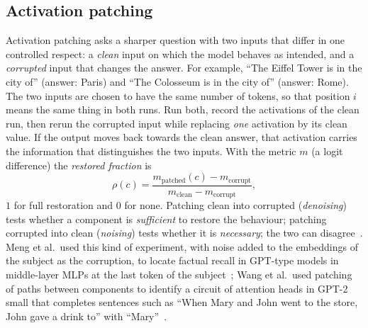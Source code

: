 \documentclass[11pt]{article}
\begin{document}
\subsection{Activation patching}\label{sec:patching}

Activation patching asks a sharper question with two inputs that differ in one controlled respect: a \emph{clean} input on
which the model behaves as intended, and a \emph{corrupted} input that changes the answer. For example, ``The Eiffel Tower
is in the city of'' (answer: Paris) and ``The Colosseum is in the city of'' (answer: Rome). The two inputs are chosen to
have the same number of tokens, so that position $i$ means the same thing in both runs. Run both, record the activations
of the clean run, then rerun the corrupted input while replacing \emph{one} activation by its clean value. If the output
moves back towards the clean answer, that activation carries the information that distinguishes the two inputs. With the
metric $m$ (a logit difference) the \emph{restored fraction} is
\begin{equation}\label{eq:restored}
  \rho(c) = \frac{m_{\text{patched}}(c) - m_{\text{corrupt}}}{m_{\text{clean}} - m_{\text{corrupt}}} ,
\end{equation}
$1$ for full restoration and $0$ for none. Patching clean into corrupted (\emph{denoising}) tests whether a component is
\emph{sufficient} to restore the behaviour; patching corrupted into clean (\emph{noising}) tests whether it is
\emph{necessary}; the two can disagree~\cite{heimersheim2024}. Meng et al.\ used this kind of experiment, with noise added
to the embeddings of the subject as the corruption, to locate factual recall in GPT-type models in middle-layer MLPs at the
last token of the subject~\cite{meng2022}; Wang et al.\ used patching of paths between components to identify a circuit of
attention heads in GPT-2 small that completes sentences such as ``When Mary and John went to the store, John gave a drink
to'' with ``Mary''~\cite{wang2023}.
\end{document}
